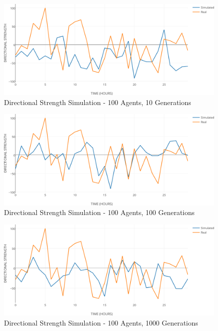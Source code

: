 \documentclass[a4paper,twoside]{article}
\begin{document}
\begin{figure}[h!]
\begin{center}
\includegraphics[width=1.00\columnwidth]{figures/ds-sim-100agents-10gen/ds-sim-100agents-10gen}
\caption{{\label{ds-prediction-10}Directional Strength Simulation - 100 Agents, 10 Generations%
}}
\end{center}
\end{figure}

\begin{figure}[h!]
\begin{center}
\includegraphics[width=1.00\columnwidth]{figures/ds-sim-100agents-100gen/ds-sim-100agents-100gen}
\caption{{\label{ds-prediction-100}Directional Strength Simulation - 100 Agents, 100 Generations%
}}
\end{center}
\end{figure}

\begin{figure}[h!]
\begin{center}
\includegraphics[width=1.00\columnwidth]{figures/ds-sim-100agents-1000gen/ds-sim-100agents-1000gen}
\caption{{\label{ds-prediction-1000}Directional Strength Simulation - 100 Agents, 1000 Generations%
}}
\end{center}
\end{figure}
\end{document}
